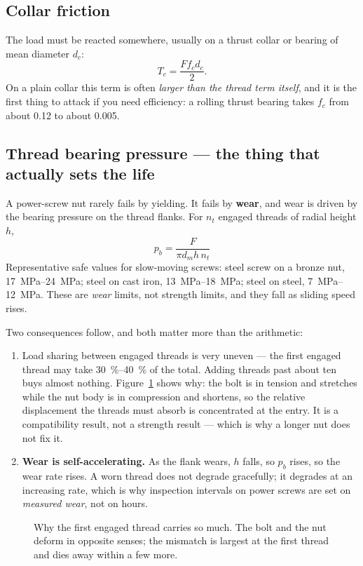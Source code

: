 \documentclass[11pt,a4paper]{article}
\begin{document}
\subsection{Collar friction}

The load must be reacted somewhere, usually on a thrust collar or bearing of mean diameter $d_c$:
\[
T_c = \frac{F f_c d_c}{2}.
\]
On a plain collar this term is often \emph{larger than the thread term itself}, and it is the first
thing to attack if you need efficiency: a rolling thrust bearing takes $f_c$ from about 0.12 to about
0.005.

\subsection{Thread bearing pressure --- the thing that actually sets the life}

A power-screw nut rarely fails by yielding. It fails by \textbf{wear}, and wear is driven by the
bearing pressure on the thread flanks. For $n_t$ engaged threads of radial height $h$,
\[
\boxed{\;p_b = \frac{F}{\pi d_m h\, n_t}\;}
\]
Representative safe values for slow-moving screws: steel screw on a bronze nut,
\SIrange{17}{24}{MPa}; steel on cast iron, \SIrange{13}{18}{MPa}; steel on steel,
\SIrange{7}{12}{MPa}. These are \emph{wear} limits, not strength limits, and they fall as sliding
speed rises.

\medskip
Two consequences follow, and both matter more than the arithmetic:
\begin{enumerate}[nosep]
  \item Load sharing between engaged threads is very uneven --- the first engaged thread may take
        \SIrange{30}{40}{\percent} of the total. Adding threads past about ten buys almost nothing.
        Figure~\ref{fig:share} shows why: the bolt is in tension and stretches while the nut body is in compression
        and shortens, so the relative displacement the threads must absorb is concentrated at the
        entry. It is a compatibility result, not a strength result --- which is why a longer nut does
        not fix it.
  \item \textbf{Wear is self-accelerating.} As the flank wears, $h$ falls, so $p_b$ rises, so the wear
        rate rises. A worn thread does not degrade gracefully; it degrades at an increasing rate,
        which is why inspection intervals on power screws are set on \emph{measured wear}, not on hours.
\end{enumerate}

\begin{figure}[H]\centering
\resizebox{0.86\textwidth}{!}{}
\caption{Why the first engaged thread carries so much. The bolt and the nut deform in opposite senses;
the mismatch is largest at the first thread and dies away within a few more.}
\label{fig:share}
\end{figure}
\end{document}

